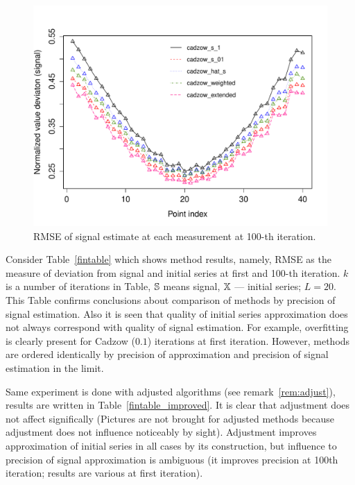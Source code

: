 \documentclass[12pt,a4paper,fleqn,leqno]{article}
\begin{document}
\begin{figure}[!hhh]
\begin{center}
\includegraphics[width = 13cm]{s1_it100.pdf}
\caption{RMSE of signal estimate at each measurement at 100-th iteration.}
\label{fig:s1_it100}
\end{center}
\end{figure}

Consider Table~\ref{fintable} which shows method results, namely, RMSE as the measure of deviation from signal and initial series at first and 100-th iteration. $k$ is a number of iterations in Table, $\mathbb{S}$ means signal, $\mathbb{X}$ --- initial series; $L=20$. This Table confirms conclusions about comparison of methods by precision of signal estimation. Also it is seen that quality of initial series approximation does not always correspond with quality of signal estimation. For example, overfitting is clearly present for Cadzow ($0.1$) iterations at first iteration. However, methods are ordered identically by precision of approximation and precision of signal estimation in the limit.

Same experiment is done with adjusted algorithms (see remark~\ref{rem:adjust}), results are written in Table~\ref{fintable_improved}. It is clear that adjustment does not affect significally (Pictures are not brought for adjusted methods because adjustment does not influence noticeably by sight). Adjustment improves approximation of initial series in all cases by its construction, but influence to precision of signal approximation is ambiguous (it improves precision at 100th iteration; results are various at first iteration).
\end{document}
